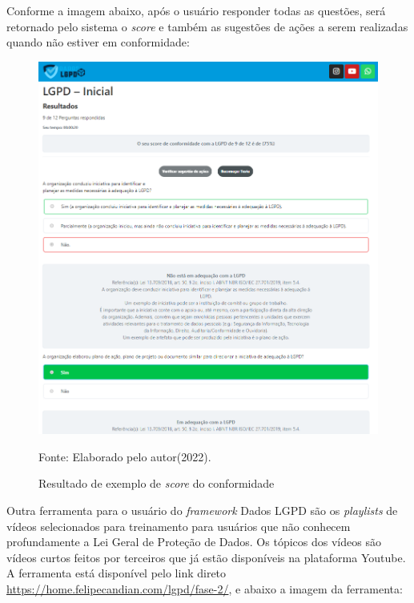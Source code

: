 \documentclass[
	12pt,				%
	openright,			%
	oneside,			%
	a4paper,			%
	english,			%
	french,				%
	spanish,			%
	brazil,				%
	]{abntex2}
\begin{document}
Conforme a imagem abaixo, após o usuário responder todas as questões, será retornado pelo sistema o \textit{score} e também as sugestões de ações a serem realizadas quando não estiver em conformidade:
\begin{figure}[ht]
    \centering
    \caption{Resultado de exemplo de \textit{score} do conformidade }
    \includegraphics[width=6.8in]{Images/resultado.png}
    \label{fig: resultado}
    
    \centering \small Fonte: Elaborado pelo autor(2022).
\end{figure}

\pagebreak

Outra ferramenta para o usuário do \textit{framework} Dados LGPD são os \textit{playlists} de vídeos selecionados para treinamento para usuários que não conhecem profundamente a Lei Geral de Proteção de Dados. Os tópicos dos vídeos são vídeos curtos feitos por terceiros que já estão disponíveis na plataforma Youtube.
A ferramenta está disponível pelo link direto \url{https://home.felipecandian.com/lgpd/fase-2/}, e abaixo a imagem da ferramenta:
\end{document}
